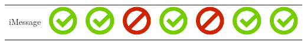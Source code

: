 \documentclass[10pt,foldmark,tumble]{leaflet}
\begin{document}
\begin{center}
{{\begin{tabular}{ L{2cm} | C{2cm} | C{2cm} | C{2cm} | C{2cm} | C{2cm} | C{2cm} | C{2cm} }
iMessage & \includegraphics[scale=0.1]{pics/haken.png} & \includegraphics[scale=0.1]{pics/haken.png} & \includegraphics[scale=0.1]{pics/nohaken.png} & \includegraphics[scale=0.1]{pics/haken.png} & \includegraphics[scale=0.1]{pics/nohaken.png} & \includegraphics[scale=0.1]{pics/haken.png} & \includegraphics[scale=0.1]{pics/haken.png} \tabularnewline

\end{tabular}}}
\end{center}
\end{document}
